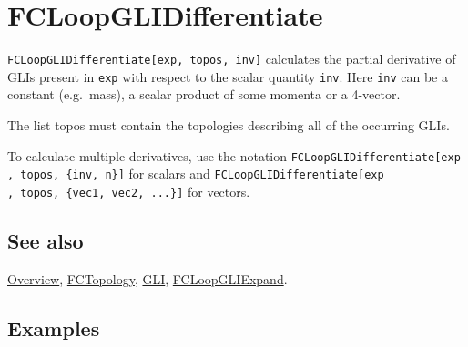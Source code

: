 \documentclass[../FeynCalcManual.tex]{subfiles}
\begin{document}
\hypertarget{fcloopglidifferentiate}{
\section{FCLoopGLIDifferentiate}\label{fcloopglidifferentiate}}

\texttt{FCLoopGLIDifferentiate[\allowbreak{}exp,\ \allowbreak{}topos,\ \allowbreak{}inv]}
calculates the partial derivative of GLIs present in \texttt{exp} with
respect to the scalar quantity \texttt{inv}. Here \texttt{inv} can be a
constant (e.g.~mass), a scalar product of some momenta or a 4-vector.

The list topos must contain the topologies describing all of the
occurring GLIs.

To calculate multiple derivatives, use the notation
\texttt{FCLoopGLIDifferentiate[\allowbreak{}exp ,\ \allowbreak{}topos,\ \allowbreak{}\{\allowbreak{}inv,\ \allowbreak{}n\}]}
for scalars and
\texttt{FCLoopGLIDifferentiate[\allowbreak{}exp ,\ \allowbreak{}topos,\ \allowbreak{}\{\allowbreak{}vec1,\ \allowbreak{}vec2,\ \allowbreak{}...\}]}
for vectors.

\subsection{See also}

\hyperlink{toc}{Overview}, \hyperlink{fctopology}{FCTopology},
\hyperlink{gli}{GLI}, \hyperlink{fcloopgliexpand}{FCLoopGLIExpand}.

\subsection{Examples}

\begin{Shaded}
\begin{Highlighting}[]
\OperatorTok{[}\OperatorTok{[}\OperatorTok{,} \OperatorTok{\{}\OperatorTok{,} \OperatorTok{,} \OperatorTok{\}],} 
  \OperatorTok{\{}\OperatorTok{[}\OperatorTok{,} \OperatorTok{\{}\OperatorTok{[\{}\OperatorTok{,}\OperatorTok{\}],}\OperatorTok{[\{}\OperatorTok{,}\OperatorTok{\}],}\OperatorTok{[\{}\SpecialCharTok{{-}}\OperatorTok{,}\OperatorTok{\}]\},} \OperatorTok{\{}\OperatorTok{,}\OperatorTok{\},} \OperatorTok{\{\},} \OperatorTok{\{\},} \OperatorTok{\{\}]\},}\OperatorTok{]}
\end{Highlighting}
\end{Shaded}
\end{document}
